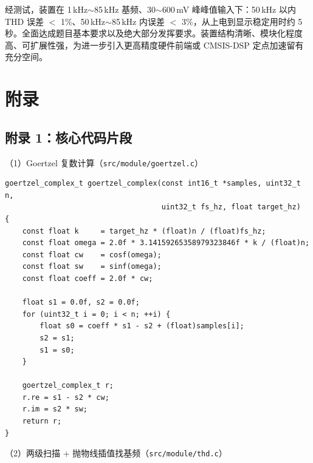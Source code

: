 \documentclass[a4paper]{article}
\begin{document}
	经测试，装置在 1\,kHz$\sim$85\,kHz 基频、30$\sim$600\,mV 峰峰值输入下：50\,kHz 以内 THD 误差 $<$ 1\%、50\,kHz$\sim$85\,kHz 内误差 $<$ 3\%，从上电到显示稳定用时约 5 秒。全面达成题目基本要求以及绝大部分发挥要求。装置结构清晰、模块化程度高、可扩展性强，为进一步引入更高精度硬件前端或 CMSIS-DSP 定点加速留有充分空间。



	\newpage
	\section*{附录}

	\subsection*{附录 1：核心代码片段}

	（1）Goertzel 复数计算（\texttt{src/module/goertzel.c}）

	\begin{lstlisting}[caption={Goertzel 复数版本：一次扫描同时得到实部与虚部，用于计算谐波幅度和相位}]
goertzel_complex_t goertzel_complex(const int16_t *samples, uint32_t n,
                                    uint32_t fs_hz, float target_hz)
{
    const float k     = target_hz * (float)n / (float)fs_hz;
    const float omega = 2.0f * 3.14159265358979323846f * k / (float)n;
    const float cw    = cosf(omega);
    const float sw    = sinf(omega);
    const float coeff = 2.0f * cw;

    float s1 = 0.0f, s2 = 0.0f;
    for (uint32_t i = 0; i < n; ++i) {
        float s0 = coeff * s1 - s2 + (float)samples[i];
        s2 = s1;
        s1 = s0;
    }

    goertzel_complex_t r;
    r.re = s1 - s2 * cw;
    r.im = s2 * sw;
    return r;
}
	\end{lstlisting}

	（2）两级扫描 + 抛物线插值找基频（\texttt{src/module/thd.c}）
\end{document}
